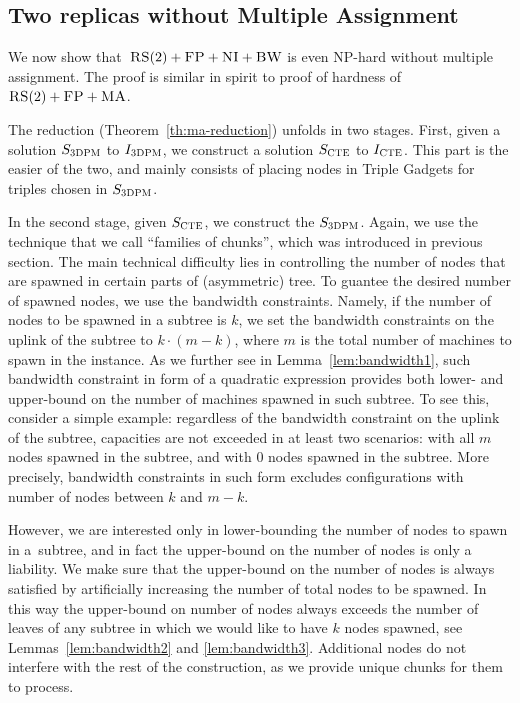 \subsection{Two replicas without Multiple Assignment}\label{ap:tworep-ni}

We now show that~$\textsc{RS}(2)+\textsc{FP}+\textsc{NI}+\textsc{BW}$ is even NP-hard without multiple
assignment.
The proof is similar in spirit to proof of hardness of $\textsc{RS}(2)+\textsc{FP}+\textsc{MA}$.

The reduction (Theorem~\ref{th:ma-reduction}) unfolds in two stages.
First, given a solution $S_{\mathrm{\textsc{3DPM}}}$ to $I_{\mathrm{\textsc{3DPM}}}$, we construct a solution $S_{\mathrm{\textsc{CTE}}}$ to $I_{\mathrm{\textsc{CTE}}}$.
This part is the easier of the two, and mainly consists of placing nodes in Triple Gadgets for triples chosen in $S_{\mathrm{\textsc{3DPM}}}$.

In the second stage, given $S_{\mathrm{\textsc{CTE}}}$, we construct the $S_{\mathrm{\textsc{3DPM}}}$.
Again, we use the technique that we call ``families of chunks'', which was introduced in previous section.
The main technical difficulty lies in controlling the number of nodes that are spawned in certain parts of (asymmetric) tree.
To guantee the desired number of spawned nodes, we use the bandwidth constraints.
Namely, if the number of nodes to be spawned in a subtree is $k$, we set the bandwidth constraints on the uplink of the subtree to $k\cdot (m - k)$, where $m$ is the total number of machines to spawn in the instance.
As we further see in Lemma~\ref{lem:bandwidth1}, such bandwidth constraint in form of a quadratic expression provides both lower- and upper-bound on the number of machines spawned in such subtree.
To see this, consider a simple example: regardless of the bandwidth constraint on the uplink of the subtree, capacities are not exceeded in at least two scenarios: with all $m$ nodes spawned in the subtree, and with $0$ nodes spawned in the subtree.
More precisely, bandwidth constraints in such form excludes configurations with number of nodes between $k$ and $m-k$.

However, we are interested only in lower-bounding the number of nodes to spawn in a~subtree, and in fact the upper-bound on the number of nodes is only a liability.
We make sure that the upper-bound on the number of nodes is always satisfied by artificially increasing the number of total nodes to be spawned.
In this way the upper-bound on number of nodes always exceeds the number of leaves of any subtree in which we would like to have $k$ nodes spawned, see Lemmas~\ref{lem:bandwidth2} and \ref{lem:bandwidth3}.
Additional nodes do not interfere with the rest of the construction, as we provide unique chunks for them to process.



